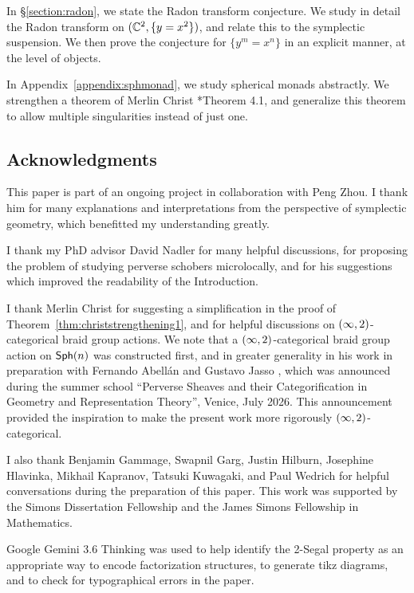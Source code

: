 In \S\ref{section:radon}, we state the Radon transform conjecture. We study in detail the Radon transform on $(\mathbb{C}^2,\{y=x^2\})$, and relate this to the symplectic suspension. We then prove the conjecture for $\{y^m=x^n\}$ in an explicit manner, at the level of objects.

In Appendix~\ref{appendix:sphmonad}, we study spherical monads abstractly. We strengthen a theorem of Merlin Christ \cite{christSphericalMonadicAdjunctions2023}*{Theorem 4.1}, and generalize this theorem to allow multiple singularities instead of just one.

\subsection{Acknowledgments}
This paper is part of an ongoing project in collaboration with Peng Zhou. I thank him for many explanations and interpretations from the perspective of symplectic geometry, which benefitted my understanding greatly.

I thank my PhD advisor David Nadler for many helpful discussions, for proposing the problem of studying perverse schobers microlocally, and for his suggestions which improved the readability of the Introduction.

I thank Merlin Christ for suggesting a simplification in the proof of Theorem~\ref{thm:christstrengthening1}, and for helpful discussions on $(\infty,2)$-categorical braid group actions. We note that a $(\infty,2)$-categorical braid group action on $\mathsf{Sph}(n)$ was constructed first, and in greater generality in his work in preparation with Fernando Abell\'an and Gustavo Jasso \cite{acj}, which was announced during the summer school ``Perverse Sheaves and their Categorification in Geometry and Representation Theory'', Venice, July 2026. This announcement provided the inspiration to make the present work more rigorously $(\infty,2)$-categorical.

I also thank Benjamin Gammage, Swapnil Garg, Justin Hilburn, Josephine Hlavinka, Mikhail Kapranov, Tatsuki Kuwagaki, and Paul Wedrich for helpful conversations during the preparation of this paper. This work was supported by the Simons Dissertation Fellowship and the James Simons Fellowship in Mathematics.

Google Gemini 3.6 Thinking was used to help identify the 2-Segal property as an appropriate way to encode factorization structures, to generate tikz diagrams, and to check for typographical errors in the paper.